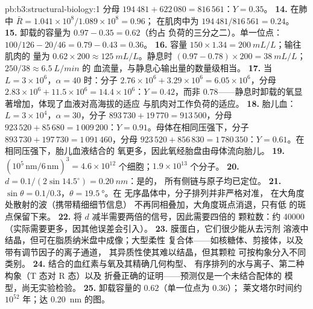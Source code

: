 \begin{solution}{pb:b3:structural-biology:1}
分母 $194\,481 + 622\,080 = 816\,561$：$Y = 0.35$。
\textbf{14.} 在肺中 $\bar R = 1.041\times 10^{8}/1.089\times 10^{8} = 0.96$；
在肌肉中为 $194\,481/816\,561 = 0.24$。
\textbf{15.} 卸载的容量为 $0.97 - 0.35 = 0.62$（约占
负荷的三分之二）。单一位点：$100/126 - 20/46 = 0.79 - 0.43 = 0.36$。
\textbf{16.} 容量 $150\times 1.34 = \qty{200}{mL/L}$；输往肌肉的
量为 $0.62\times 200 \approx \qty{125}{mL/L}$。静息时 $(0.97 - 0.78)\times
200 = \qty{38}{mL/L}$；$250/38 \approx \qty{6.5}{L/min}$ 的
血流量，与静息心输出量的数量级相当。
\textbf{17.} 当 $L = 3\times 10^{6}$，$\alpha = 40$ 时：分子 $2.76\times
10^{6} + 3.29\times 10^{6} = 6.05\times 10^{6}$，分母 $2.83\times
10^{6} + 11.5\times 10^{6} = 14.4\times 10^{6}$：$Y = 0.42$，而非
$0.78$——静息时卸载的氧显著增加，体现了血液对高海拔的适应
与肌肉对工作负荷的适应。
\textbf{18.} 胎儿血：$L = 3\times 10^{4}$，$\alpha = 30$，分子
$893\,730 + 19\,770 = 913\,500$，分母 $923\,520 + 85\,680 =
1\,009\,200$：$Y = 0.91$。母体在相同压强下，分子
$893\,730 + 197\,730 = 1\,091\,460$，分母 $923\,520 + 856\,830
= 1\,780\,350$：$Y = 0.61$。在相同压强下，胎儿血液结合的
氧更多，因此氧经胎盘由母体流向胎儿。
\textbf{19.} $(10^{5}\,\text{nm}/6\,\text{nm})^{3} = 4.6\times 10^{12}$
个细胞；$1.9\times 10^{13}$ 个分子。
\textbf{20.} $d = 0.1/(2\sin 14.5^{\circ}) = \qty{0.20}{nm}$：是的，
所有侧链与原子均已定位。
\textbf{21.} $\sin\theta = 0.1/0.3$，$\theta = \qty{19.5}{\degree}$。在
无序晶体中，分子排列并非严格对准，
在大角度处散射的波（携带精细细节信息）
不再同相叠加，大角度斑点消退，只有低
的斑点保留下来。
\textbf{22.} 将 $d$ 减半需要两倍的信号，因此需要四倍的
颗粒数：约 \num{40000}（实际需要更多，因其他误差会引入）。
\textbf{23.} 膜蛋白，它们很少能从去污剂
溶液中结晶，但可在脂质纳米盘中成像；大型柔性
复合体——如核糖体、剪接体，以及带有调节因子的离子通道，
其异质性使其难以结晶，但其颗粒
可按构象分入不同类别。
\textbf{24.} 结合的血红素与氧及其精确几何构型、
有序排列的水与离子、第二种构象（T 态对 R 态）以及
折叠正确的证明——预测仅是一个未结合配体的
模型，尚无实验检验。
\textbf{25.} 卸载容量的 $0.62$（单一位点为 $0.36$）；
莱文塔尔时间约 $10^{52}$ 年；达 \qty{0.20}{nm} 的图。
\end{solution}
